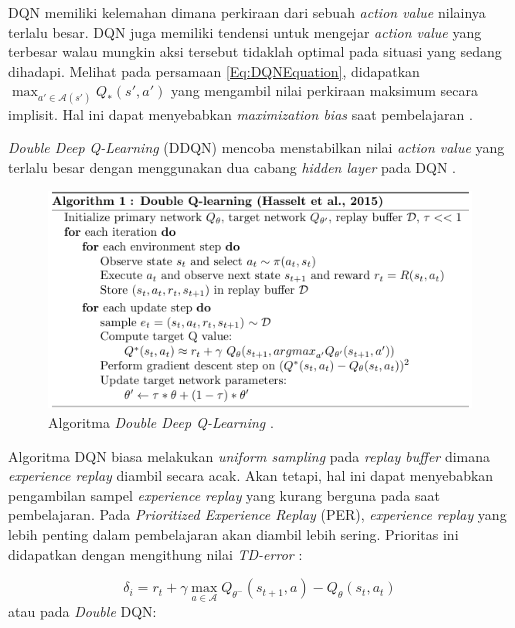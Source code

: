 DQN memiliki kelemahan dimana perkiraan dari sebuah \emph{action value} nilainya terlalu besar.
DQN juga memiliki tendensi untuk mengejar \emph{action value} yang terbesar walau mungkin aksi tersebut tidaklah optimal pada situasi yang sedang dihadapi.
Melihat pada persamaan \ref{Eq:DQNEquation}, didapatkan $\max_{a'\in\mathcal{A}(s')}Q_*(s',a')$
yang mengambil nilai perkiraan maksimum secara implisit. Hal ini dapat menyebabkan \emph{maximization bias}
saat pembelajaran \cite{doubleQLearning}.

\emph{Double Deep Q-Learning} (DDQN) mencoba menstabilkan nilai \emph{action value} yang terlalu besar dengan menggunakan dua cabang \emph{hidden layer} pada DQN \citep{doubleDQN}.

\begin{figure}[H]
  \centering
    \includegraphics[scale=0.7]{gambar/ddqn_algorithm.png}
    \caption{Algoritma \emph{Double Deep Q-Learning} \citep{doubleDQN}.}
    \label{fig:ddqnAlgorithm}
\end{figure}

Algoritma DQN biasa melakukan \emph{uniform sampling} pada \emph{replay buffer} dimana
\emph{experience replay} diambil secara acak. Akan tetapi, hal ini dapat menyebabkan pengambilan sampel \emph{experience replay} yang kurang berguna pada saat pembelajaran.
Pada \emph{Prioritized Experience Replay} (PER), \emph{experience replay} yang lebih penting dalam
pembelajaran akan diambil lebih sering.
Prioritas ini didapatkan dengan mengithung nilai \emph{TD-error} \citep{prioritizedER}:

\begin{equation}
  \delta_{i} = r_{t} + \gamma \max_{a\in\mathcal{A}}Q_{\theta ^{-}}(s_{t+1},a) - Q_{\theta}(s_{t},a_{t})
  \label{Eq:DQNTDErrorEquation}
\end{equation}
atau pada \emph{Double} DQN:

